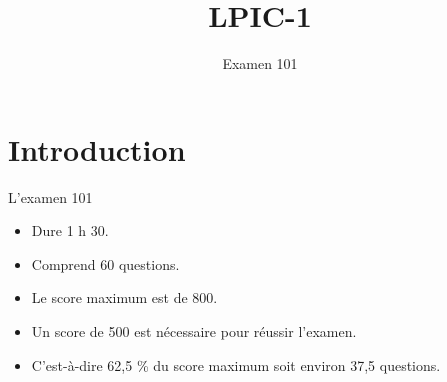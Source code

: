 \documentclass[aspectratio=43]{beamer}
\title{LPIC-1}
\subtitle{Examen 101}
\begin{document}

\begin{frame}


\titlepage

\end{frame}


\section*{Introduction}








\begin{frame}{L'examen 101}

\begin{itemize}

\item Dure 1 h 30.

\item Comprend 60 questions.

\item Le score maximum est de 800.

\item Un score de 500 est nécessaire pour réussir l'examen.

\item C'est-à-dire 62,5 \% du score maximum soit environ 37,5 questions.

\end{itemize}

\begin{toile}
\end{toile}

\end{frame}

\end{document}
